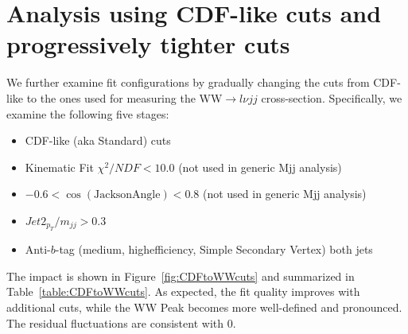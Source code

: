 \section{Analysis using CDF-like cuts and progressively tighter cuts}
We further examine fit configurations by gradually changing the cuts
from CDF-like to the ones used for measuring the WW$\to l\nu jj$
cross-section. Specifically, we examine the following five stages:
\begin{itemize}
\item CDF-like (aka Standard) cuts
\item Kinematic Fit $\chi^2/NDF<10.0$ (not used in generic Mjj analysis)
\item $-0.6<\cos (\textrm{JacksonAngle})<0.8$ (not used in generic Mjj analysis)
\item $Jet2_{p_T}/m_{jj}>0.3$
\item Anti-$b$-tag (medium, highefficiency, Simple Secondary Vertex) both jets
\end{itemize}
The impact is shown in Figure~\ref{fig:CDFtoWWcuts} and summarized in
Table~\ref{table:CDFtoWWcuts}. As expected, the fit quality improves
with additional cuts, while the WW Peak becomes more well-defined and
pronounced. The residual fluctuations are consistent with 0.

